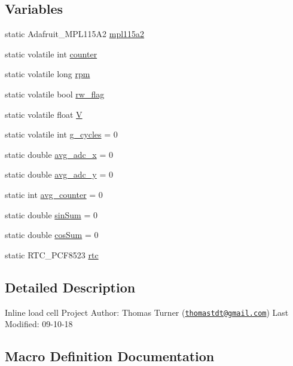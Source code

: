 \subsection*{Variables}
\begin{DoxyCompactItemize}
\item 
static Adafruit\+\_\+\+M\+P\+L115\+A2 \mbox{\hyperlink{windsensor_8ino_ad968397c6ea6b9db90c2cab353353f5a}{mpl115a2}}
\item 
static volatile int \mbox{\hyperlink{windsensor_8ino_a3d4f497af9a194d9e03e5d9a9b0ee67d}{counter}}
\item 
static volatile long \mbox{\hyperlink{windsensor_8ino_a1571ae0d208fed39e6690affb377db08}{rpm}}
\item 
static volatile bool \mbox{\hyperlink{windsensor_8ino_a2ff89ca4ee93f613d9003947a163355b}{rw\+\_\+flag}}
\item 
static volatile float \mbox{\hyperlink{windsensor_8ino_aa4fd0d57d98c7d4f1072f2edd19ab2ed}{V}}
\item 
static volatile int \mbox{\hyperlink{windsensor_8ino_a04af5fae2fee3e96724c5a2d4cdba9ea}{g\+\_\+cycles}} = 0
\item 
static double \mbox{\hyperlink{windsensor_8ino_a4e68dc721cdeec90403f8d51073a0ff7}{avg\+\_\+adc\+\_\+x}} = 0
\item 
static double \mbox{\hyperlink{windsensor_8ino_a9721778a8fa458f3ae824eceb7d8f703}{avg\+\_\+adc\+\_\+y}} = 0
\item 
static int \mbox{\hyperlink{windsensor_8ino_a7f1aa577037cdb41a6226fd5f24143be}{avg\+\_\+counter}} = 0
\item 
static double \mbox{\hyperlink{windsensor_8ino_af16089af53c1a813d5decdf37fd8382f}{sin\+Sum}} = 0
\item 
static double \mbox{\hyperlink{windsensor_8ino_ae99d45425d50ae8be8137abd39020329}{cos\+Sum}} = 0
\item 
static R\+T\+C\+\_\+\+P\+C\+F8523 \mbox{\hyperlink{windsensor_8ino_adab40bd3cc2c36728a2a34e813a75b88}{rtc}}
\end{DoxyCompactItemize}


\subsection{Detailed Description}
Inline load cell Project Author\+: Thomas Turner (\href{mailto:thomastdt@gmail.com}{\tt thomastdt@gmail.\+com}) Last Modified\+: 09-\/10-\/18 

\subsection{Macro Definition Documentation}
\mbox{\label{windsensor_8ino_adb3564163b909516cbda0c168dbba86a}} 
